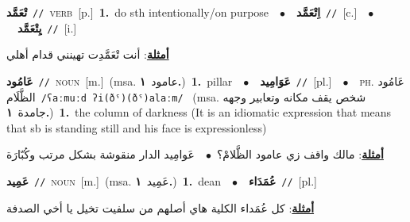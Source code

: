 \documentclass[10pt,a4paper,twoside]{article} %
\begin{document}
\begin{multicols}{2}
{\setlength\topsep{0pt}\textbf{\foreignlanguage{arabic}{تْعَمَّد}}\ {\color{gray}\texttt{//}\color{black}}\ \textsc{verb}\ [p.]\ \textbf{1.}~do sth intentionally/on purpose\ \ $\bullet$\ \ \setlength\topsep{0pt}\textbf{\foreignlanguage{arabic}{اِتْعَمَّد}}\ {\color{gray}\texttt{//}\color{black}}\ [c.]\ \ $\bullet$\ \ \setlength\topsep{0pt}\textbf{\foreignlanguage{arabic}{يِتْعَمَّد}}\ {\color{gray}\texttt{//}\color{black}}\ [i.]\  \begin{flushright}\color{gray}\foreignlanguage{arabic}{\textbf{\underline{\foreignlanguage{arabic}{أمثلة}}}: أنت تْعَمَّدِت تهينني قدام أهلي}\end{flushright}\color{black}} \vspace{2mm}

{\setlength\topsep{0pt}\textbf{\foreignlanguage{arabic}{عَامُود}}\ {\color{gray}\texttt{//}\color{black}}\ \textsc{noun}\ [m.]\ \color{gray}(msa. \foreignlanguage{arabic}{عامود}~\foreignlanguage{arabic}{\textbf{١.}})\color{black}\ \textbf{1.}~pillar\ \ $\bullet$\ \ \setlength\topsep{0pt}\textbf{\foreignlanguage{arabic}{عَوَامِيد}}\ {\color{gray}\texttt{//}\color{black}}\ [pl.]\ \ $\bullet$\ \ \textsc{ph.} \color{gray} \foreignlanguage{arabic}{عَامُود الظَّلَام}\color{black}\ {\color{gray}\texttt{/{\sffamily ʕaːmuːd ʔi(ðˤ)(ðˤ)alaːm}/}\color{black}}\ \color{gray} (msa. \foreignlanguage{arabic}{شخص يقف مكانه وتعابير وجهه جامدة}~\foreignlanguage{arabic}{\textbf{١.}})\color{black}\ \textbf{1.}~the column of darkness (It is an idiomatic expression that means that sb is standing still and his face is expressionless)\  \begin{flushright}\color{gray}\foreignlanguage{arabic}{\textbf{\underline{\foreignlanguage{arabic}{أمثلة}}}: مالك واقف زي عامود الظَّلامْ؟\ $\bullet$\ \  عَوامِيد الدار منقوشة بشكل مرتب وكُبّارَة}\end{flushright}\color{black}} \vspace{2mm}

{\setlength\topsep{0pt}\textbf{\foreignlanguage{arabic}{عَمِيد}}\ {\color{gray}\texttt{//}\color{black}}\ \textsc{noun}\ [m.]\ \color{gray}(msa. \foreignlanguage{arabic}{عَمِيد}~\foreignlanguage{arabic}{\textbf{١.}})\color{black}\ \textbf{1.}~dean\ \ $\bullet$\ \ \setlength\topsep{0pt}\textbf{\foreignlanguage{arabic}{عُمَدَاء}}\ {\color{gray}\texttt{//}\color{black}}\ [pl.]\  \begin{flushright}\color{gray}\foreignlanguage{arabic}{\textbf{\underline{\foreignlanguage{arabic}{أمثلة}}}: كل عُمَداء الكلية هاي أصلهم من سلفيت تخيل يا أخي الصدفة}\end{flushright}\color{black}} \vspace{2mm}


\end{multicols}
\end{document}
